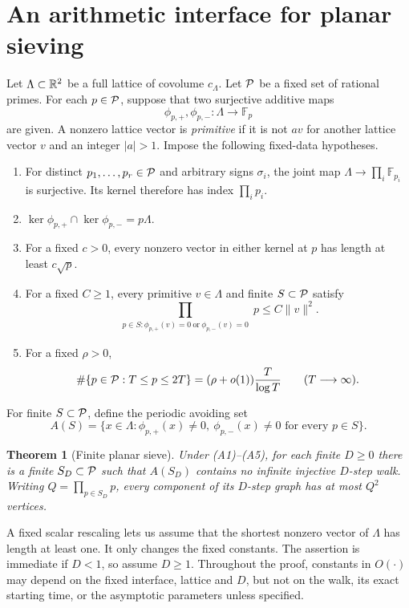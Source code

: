 \documentclass[11pt]{article}
\numberwithin{equation}{section}
\newtheorem{theorem}{Theorem}[section]
\theoremstyle{definition}\newtheorem{definition}[theorem]{Definition}
\theoremstyle{remark}\newtheorem{remark}[theorem]{Remark}
\newcommand{\F}{\mathbb F}\newcommand{\C}{\mathbb C}
\newcommand{\norm}[1]{\lVert #1\rVert}
\newcommand{\abs}[1]{\lvert #1\rvert}
\newcommand{\set}[1]{\{#1\}}
\begin{document}
\section{An arithmetic interface for planar sieving}\label{sec:interface}

Let $\Lambda\subset\mathbb R^2$ be a full lattice of covolume $c_\Lambda$. Let $\mathcal P$ be a fixed set of rational primes. For each $p\in\mathcal P$, suppose that two surjective additive maps
\[
 \phi_{p,+},\phi_{p,-}:\Lambda\longrightarrow\F_p
\]
are given. A nonzero lattice vector is \emph{primitive} if it is not $av$ for another lattice vector $v$ and an integer $\abs a>1$. Impose the following fixed-data hypotheses.
\begin{enumerate}[label=\textup{(A\arabic*)},leftmargin=3.6em]
\item\label{ax:crt} For distinct $p_1,\ldots,p_r\in\mathcal P$ and arbitrary signs $\sigma_i$, the joint map $\Lambda\to\prod_i\F_{p_i}$ is surjective. Its kernel therefore has index $\prod_i p_i$.
\item\label{ax:pair} $\ker\phi_{p,+}\cap\ker\phi_{p,-}=p\Lambda$.
\item\label{ax:collision} For a fixed $c>0$, every nonzero vector in either kernel at $p$ has length at least $c\sqrt p$.
\item\label{ax:product} For a fixed $C\ge1$, every primitive $v\in\Lambda$ and finite $S\subset\mathcal P$ satisfy
\[
 \prod_{\substack{p\in S:\phi_{p,+}(v)=0\ \text{or}\ \phi_{p,-}(v)=0}}p
 \le C\norm v^2.
\]
\item\label{ax:density} For a fixed $\rho>0$,
\[
 \#\set{p\in\PP:T\le p\le2T}=(\rho+o(1))\frac T{\log T}
 \qquad(T\longrightarrow\infty).
\]
\end{enumerate}

For finite $S\subset\mathcal P$, define the periodic avoiding set
\[
 A(S)=\set{x\in\Lambda:\phi_{p,+}(x)\ne0,\ \phi_{p,-}(x)\ne0
                 \text{ for every }p\in S}.
\]
\begin{theorem}[Finite planar sieve]\label{thm:engine}
Under \textup{(A1)--(A5)}, for each finite $D\ge0$ there is a finite $S_D\subset\mathcal P$ such that $A(S_D)$ contains no infinite injective $D$-step walk. Writing $Q=\prod_{p\in S_D}p$, every component of its $D$-step graph has at most $Q^2$ vertices.
\end{theorem}

A fixed scalar rescaling lets us assume that the shortest nonzero vector of $\Lambda$ has length at least one. It only changes the fixed constants. The assertion is immediate if $D<1$, so assume $D\ge1$. Throughout the proof, constants in $O(\cdot)$ may depend on the fixed interface, lattice and $D$, but not on the walk, its exact starting time, or the asymptotic parameters unless specified.
\end{document}
